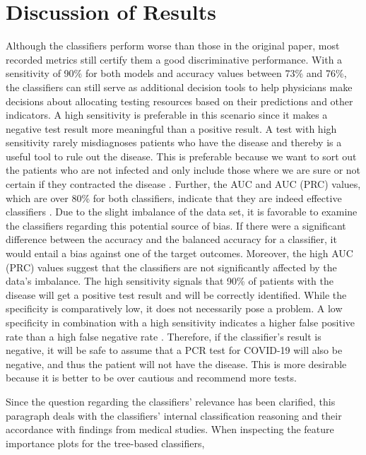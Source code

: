\section{Discussion of Results}
Although the classifiers perform worse than those in the original paper, 
most recorded metrics still certify them a good discriminative performance.
With a sensitivity of 90\% for both models and accuracy values between 73\% and 
76\%, the classifiers can still serve as additional decision tools to help 
physicians make decisions about allocating testing resources based on their 
predictions and other indicators. 
A high sensitivity is preferable in this scenario since it makes a negative test 
result more meaningful than a positive result. A test with high sensitivity 
rarely misdiagnoses patients who have the disease and thereby is a useful tool 
to rule out the disease. This is preferable because we want to sort out the 
patients who are not infected and only include those where we are sure or not 
certain if they contracted the disease \cite{RN168}.
Further, the AUC and AUC (PRC) values, which are over 80\% 
for both classifiers, indicate that they are indeed effective classifiers 
\cite{RN167}.
Due to the slight imbalance of the data set, it is  favorable to examine the 
classifiers regarding this potential source of bias. If there were a 
significant difference between the accuracy and the balanced accuracy for a 
classifier, it 
would entail a bias against one of the target outcomes. Moreover, the high AUC 
(PRC) values suggest that the classifiers are not significantly affected by the 
data's imbalance.
The high sensitivity signals that 90\% of 
patients with the disease will get a positive test result and will be correctly 
identified. 
While the specificity is comparatively low, it does not necessarily pose a 
problem. A low specificity in combination with a high sensitivity indicates a 
higher false positive rate than a high false negative rate \cite{RN168}.
Therefore, if the classifier's result is negative, it will be safe to 
assume that a PCR test for COVID-19 will also be negative, and thus the patient 
will not have the disease.
This is more desirable because it is better to be over cautious and recommend 
more tests.
\par
\label{sec:medical}
Since the question regarding the classifiers' relevance has been 
clarified, this paragraph deals with the classifiers' internal classification 
reasoning and their accordance with findings from medical studies.
When inspecting the feature importance plots for the tree-based classifiers, 
